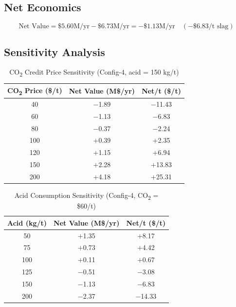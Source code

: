 \documentclass[11pt,a4paper]{article}
\begin{document}
\subsection{Net Economics}

\begin{equation}
  \text{Net Value} = \$5.60\text{M/yr} - \$6.73\text{M/yr} = -\$1.13\text{M/yr} \quad (-\$6.83/\text{t slag})
\end{equation}

\subsection{Sensitivity Analysis}

\begin{table}[H]
\centering
\caption{CO\textsubscript{2} Credit Price Sensitivity (Config-4, acid = 150 kg/t)}
\label{tab:co2_sens}
\begin{tabular}{ccc}
\toprule
\textbf{CO\textsubscript{2} Price (\$/t)} & \textbf{Net Value (M\$/yr)} & \textbf{Net/t (\$/t)} \\
\midrule
40    & $-$1.89 & $-$11.43 \\
60    & $-$1.13 & $-$6.83 \\
\rowcolor{yellow!20}
80    & $-$0.37 & $-$2.24 \\
\rowcolor{green!10}
100   & $+$0.39 & $+$2.35 \\
120   & $+$1.15 & $+$6.94 \\
150   & $+$2.28 & $+$13.83 \\
200   & $+$4.18 & $+$25.31 \\
\bottomrule
\end{tabular}
\end{table}

\begin{table}[H]
\centering
\caption{Acid Consumption Sensitivity (Config-4, CO\textsubscript{2} = \$60/t)}
\label{tab:acid_sens}
\begin{tabular}{ccc}
\toprule
\textbf{Acid (kg/t)} & \textbf{Net Value (M\$/yr)} & \textbf{Net/t (\$/t)} \\
\midrule
50    & $+$1.35  & $+$8.17 \\
75    & $+$0.73  & $+$4.42 \\
\rowcolor{green!10}
100   & $+$0.11  & $+$0.67 \\
125   & $-$0.51  & $-$3.08 \\
150   & $-$1.13  & $-$6.83 \\
200   & $-$2.37  & $-$14.33 \\
\bottomrule
\end{tabular}
\end{table}
\end{document}
